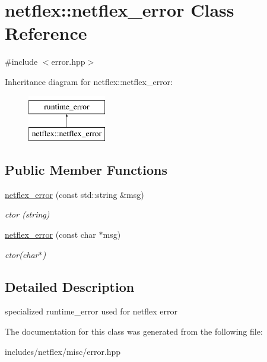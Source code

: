\hypertarget{classnetflex_1_1netflex__error}{}\section{netflex\+:\+:netflex\+\_\+error Class Reference}
\label{classnetflex_1_1netflex__error}


{\ttfamily \#include $<$error.\+hpp$>$}

Inheritance diagram for netflex\+:\+:netflex\+\_\+error\+:\begin{figure}[H]
\begin{center}
\leavevmode
\includegraphics[height=2.000000cm]{classnetflex_1_1netflex__error}
\end{center}
\end{figure}
\subsection*{Public Member Functions}
\begin{DoxyCompactItemize}
\item 
\mbox{\label{classnetflex_1_1netflex__error_ac7410912ae60826d4d3c517bc77bd53d}} 
\hyperlink{classnetflex_1_1netflex__error_ac7410912ae60826d4d3c517bc77bd53d}{netflex\+\_\+error} (const std\+::string \&msg)
\begin{DoxyCompactList}\small\item\em ctor (string) \end{DoxyCompactList}\item 
\mbox{\label{classnetflex_1_1netflex__error_a1b16bd2445517eed5b9e0e276e73a023}} 
\hyperlink{classnetflex_1_1netflex__error_a1b16bd2445517eed5b9e0e276e73a023}{netflex\+\_\+error} (const char $\ast$msg)
\begin{DoxyCompactList}\small\item\em ctor(char$\ast$) \end{DoxyCompactList}\end{DoxyCompactItemize}


\subsection{Detailed Description}
specialized runtime\+\_\+error used for netflex error 

The documentation for this class was generated from the following file\+:\begin{DoxyCompactItemize}
\item 
includes/netflex/misc/error.\+hpp\end{DoxyCompactItemize}
